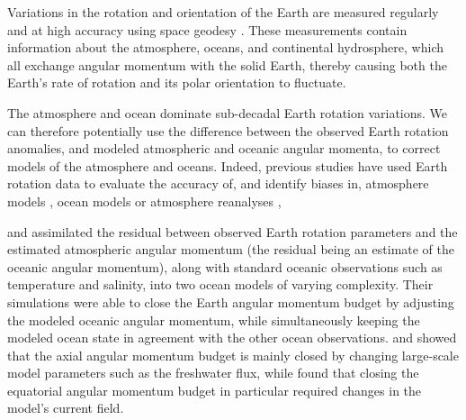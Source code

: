 
Variations in the rotation and orientation of the Earth are measured regularly and at high accuracy using space geodesy \citep{Gross1992,iers}. 
These measurements contain information about the atmosphere, oceans, and continental hydrosphere, which all exchange angular momentum with the solid Earth, thereby causing both the Earth's rate of rotation and its polar orientation to fluctuate. 

The atmosphere and ocean dominate sub-decadal Earth rotation variations. 
We can therefore potentially use the difference between the observed Earth rotation anomalies, and modeled atmospheric and oceanic angular momenta, to correct models of the atmosphere and oceans. 
Indeed, previous studies have used Earth rotation data to evaluate the accuracy of, 
and identify biases in, atmosphere models \citep{Boer1990, Rosen2000,Neef2012}, ocean 
models \citep{Gross1996a} or atmosphere reanalyses \citep{Yu1999, Aoyama2000, 
Paek2012a,Berrisford2011},

\citet{Saynisch2010,Saynisch2011} and \citet{Saynisch2012} assimilated the residual between observed Earth rotation parameters and the estimated atmospheric angular momentum (the residual being an estimate of the oceanic angular momentum), along with standard oceanic observations such as temperature and salinity, into two ocean models of varying complexity. 
Their simulations were able to close the Earth angular momentum budget by adjusting the modeled oceanic angular momentum, while simultaneously keeping the modeled ocean state in agreement with the other ocean observations.  
\citet{Saynisch2010} and \citet{Saynisch2012} showed that the axial angular momentum budget is mainly closed by changing large-scale model parameters such as the freshwater flux, while \citet{Saynisch2011} found that closing the equatorial angular momentum budget in particular required changes in the model's current field. 

